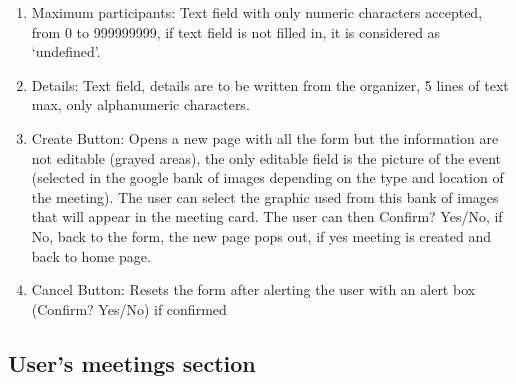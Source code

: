 \documentclass[conference]{IEEEtran}
\begin{document}
\begin{enumerate}
\item Maximum participants: Text field with only numeric characters accepted, from 0 to 999999999, if text field is not filled in, it is considered as ‘undefined’.
\item Details: Text field, details are to be written from the organizer, 5 lines of text max, only alphanumeric characters.
\item Create Button: Opens a new page with all the form but the information are not editable (grayed areas), the only editable field is the picture of the event (selected in the google bank of images depending on the type and location of the meeting). The user can select the graphic used from this bank of images that will appear in the meeting card. The user can then Confirm? Yes/No, if No, back to the form, the new page pops out, if yes meeting is created and back to home page.
\item Cancel Button: Resets the form after alerting the user with an alert box (Confirm? Yes/No) if confirmed
\end{enumerate}

\subsection{User’s meetings section}
\end{document}
